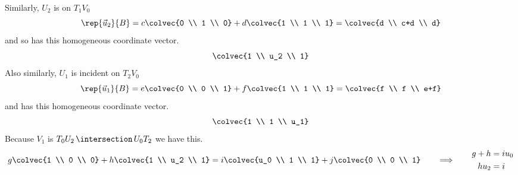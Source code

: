\begin{ans}{7}
\begin{exparts}
          Similarly, $U_2$ is on $T_1V_0$
          \begin{equation*}
            \rep{\vec{u}_2}{B}=c\colvec{0 \\ 1 \\ 0}
                                +d\colvec{1 \\ 1 \\ 1}
                              =\colvec{d \\ c+d \\ d}
          \end{equation*}
          and so has this homogeneous coordinate vector.
          \begin{equation*}
            \colvec{1 \\ u_2 \\ 1}
          \end{equation*}
          Also similarly, $U_1$ is incident on $T_2V_0$
          \begin{equation*}
            \rep{\vec{u}_1}{B}=e\colvec{0 \\ 0 \\ 1}
                                +f\colvec{1 \\ 1 \\ 1}
                              =\colvec{f \\ f \\ e+f}
          \end{equation*}
          and has this homogeneous coordinate vector.
          \begin{equation*}
            \colvec{1 \\ 1 \\ u_1}
          \end{equation*}
        \partsitem
          Because $V_1$ is $T_0U_2\,\intersection\,U_0T_2$ we have this.
          \begin{equation*}
            g\colvec{1 \\ 0 \\ 0}+h\colvec{1 \\ u_2 \\ 1}
            =i\colvec{u_0 \\ 1 \\ 1}+j\colvec{0 \\ 0 \\ 1}
            \qquad\Longrightarrow\qquad
            \begin{aligned}
              g+h  &= iu_0 \\
              hu_2 &= i    \\

\end{aligned}
\end{equation*}
\end{exparts}
\end{ans}
